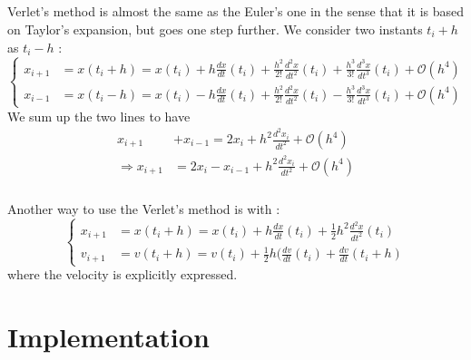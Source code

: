 \documentclass[a4paper, twoside, 11pt]{report}
\theoremstyle{theorem}
\theoremstyle{remark}
\theoremstyle{exemple}
\begin{document}
            \paragraph{}Verlet's method is almost the same as the Euler's one in the sense that it is based on Taylor's expansion, but goes one step further. We consider two instants $t_i+h$ as $t_i-h$ :
                \begin{equation*}
                    \left\{ 
                        \begin{aligned}
                            x_{i+1} &= x(t_i+h) = x(t_i) + h\frac{dx}{dt}(t_i) + \frac{h^2}{2!}\frac{d^2x}{dt^2}(t_i) + \frac{h^3}{3!}\frac{d^3x}{dt^3}(t_i)+\mathcal{O}(h^4)\\
                            x_{i-1} &= x(t_i-h) = x(t_i) - h\frac{dx}{dt}(t_i) + \frac{h^2}{2!}\frac{d^2x}{dt^2}(t_i) - \frac{h^3}{3!}\frac{d^3x}{dt^3}(t_i)+\mathcal{O}(h^4)
                        \end{aligned}
                    \right.
                \end{equation*}
            We sum up the two lines to have
                \begin{align*}
                    x_{i+1} &+ x_{i-1} = 2x_i + h^2\frac{d^2x_i}{dt^2} + \mathcal{O}(h^4) \\
                    \Rightarrow x_{i+1} &= 2x_i - x_{i-1} + h^2\frac{d^2x_i}{dt^2} + \mathcal{O}(h^4)
                \end{align*}
            \paragraph{}Another way to use the Verlet's method is with :
                \begin{equation*}
                    \left\{
                        \begin{aligned}
                            x_{i+1}&=x(t_i+h) = x(t_i) + h\frac{dx}{dt}(t_i) + \frac{1}{2}h^2 \frac{d^2x}{dt^2}(t_i)\\
                            v_{i+1}&=v(t_i+h) = v(t_i) + \frac{1}{2}h(\frac{dv}{dt}(t_i) + \frac{dv}{dt}(t_i+h)
                        \end{aligned}
                    \right.
                \end{equation*}
            where the velocity is explicitly expressed.
            


\chapter{Implementation}
\end{document}
